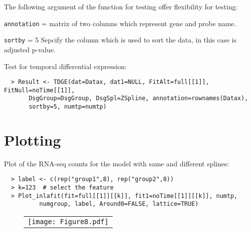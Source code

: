 \documentclass[a4paper]{article}
\begin{document}
The following argument of the function for testing offer flexibility for testing:
\begin{compactitem}
\item {\tt annotation} = matrix of two columns which represent gene and probe name. 
\item {\tt sortby} = 5 
Sepcify the column which is used to sort the data, in this case is adjusted p-value. 
\end{compactitem}
Test for temporal differential expression:

\begin{verbatim}
  > Result <- TDGE(dat=Datax, dat1=NULL, FitAlt=full[[1]], FitNull=noTime[[1]],
       DsgGroup=DsgGroup, DsgSpl=ZSpline, annotation=rownames(Datax), 
       sortby=5, numtp=numtp)
\end{verbatim}

\section{Plotting}
Plot of the RNA-seq counts for the model with same and different splines:
\begin{verbatim}
  > label <- c(rep("group1",8), rep("group2",8))
  > k=123  # select the feature
  > Plot_inlafit(fit=full[[1]][[k]], fit1=noTime[[1]][[k]], numtp,
          numgroup, label, Around0=FALSE, lattice=TRUE)
\end{verbatim}

\begin{figure}[h!]
\centering
\begin{tabular}{c}
\texttt{[image: Figure8.pdf]}
\end{tabular}
\label{fig:sameDiffSpl}
\end{figure}
\end{document}
